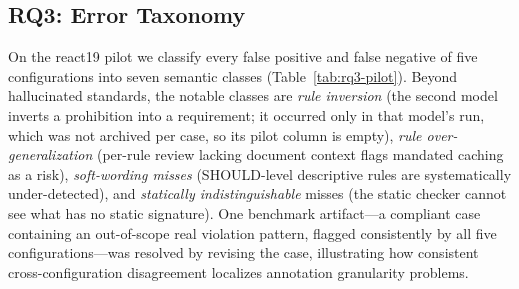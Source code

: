 \documentclass[11pt]{article}
\begin{document}
\subsection{RQ3: Error Taxonomy}
On the react19 pilot we classify every false positive and false negative of five
configurations into seven semantic classes (Table~\ref{tab:rq3-pilot}). Beyond
hallucinated standards, the notable classes are
\emph{rule inversion} (the second model inverts a prohibition into a requirement;
it occurred only in that model's run, which was not archived per case, so its
pilot column is empty), \emph{rule over-generalization} (per-rule review lacking
document context flags mandated caching as a risk), \emph{soft-wording misses}
(SHOULD-level descriptive rules are systematically under-detected), and
\emph{statically indistinguishable} misses (the static checker cannot see what
has no static signature). One benchmark artifact---a compliant case containing
an out-of-scope real violation pattern, flagged consistently by all five
configurations---was resolved by revising the case, illustrating how consistent
cross-configuration disagreement localizes annotation granularity problems.

\begin{table}[t]
\centering
\caption{Semantic error taxonomy on the react19 40-case pilot: per-configuration
FP/FN case counts (seven classes; \emph{rule inversion} occurred only in the
second model's M-verified run, reported in the text).}
\label{tab:rq3-pilot}

\end{table}
\end{document}
